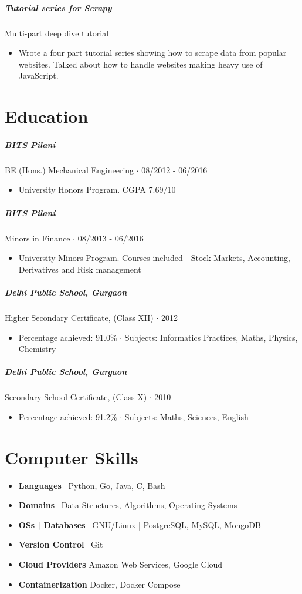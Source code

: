 \documentclass[10pt,letterpaper]{article}
\begin{document}
\subparagraph{Tutorial series for Scrapy}
Multi-part deep dive tutorial
\begin{itemize}
    \item Wrote a four part tutorial series showing how to scrape data from popular websites. Talked about how to handle websites making heavy use of JavaScript.
\end{itemize}

\section*{Education}

\subparagraph{BITS Pilani}
 BE (Hons.) Mechanical Engineering $\cdot$ 08/2012 - 06/2016
\begin{itemize}
    \item University Honors Program.  CGPA 7.69/10
\end{itemize}

\subparagraph{BITS Pilani}
Minors in Finance $\cdot$ 08/2013 - 06/2016
\begin{itemize}
    \item University Minors Program. Courses included - Stock Markets, Accounting, Derivatives and Risk management
\end{itemize}

\subparagraph{Delhi Public School, Gurgaon}
Higher Secondary Certificate, (Class XII) $\cdot$ 2012
\begin{itemize}
    \item Percentage achieved: 91.0\% $\cdot$ Subjects: Informatics Practices, Maths, Physics, Chemistry
\end{itemize}

\subparagraph{Delhi Public School, Gurgaon}
Secondary School Certificate, (Class X) $\cdot$ 2010
\begin{itemize}
    \item Percentage achieved: 91.2\% $\cdot$ Subjects: Maths, Sciences, English
\end{itemize}

\section*{Computer Skills}

\begin{itemize}
    \item \textbf{Languages} \ Python, Go, Java, C, Bash
    \item \textbf{Domains} \ Data Structures, Algorithms, Operating Systems
    \item \textbf{OSs | Databases} \ GNU/Linux | PostgreSQL, MySQL, MongoDB
    \item \textbf{Version Control} \ Git
    \item \textbf{Cloud Providers} Amazon Web Services, Google Cloud
    \item \textbf{Containerization} Docker, Docker Compose
\end{itemize}
\end{document}
